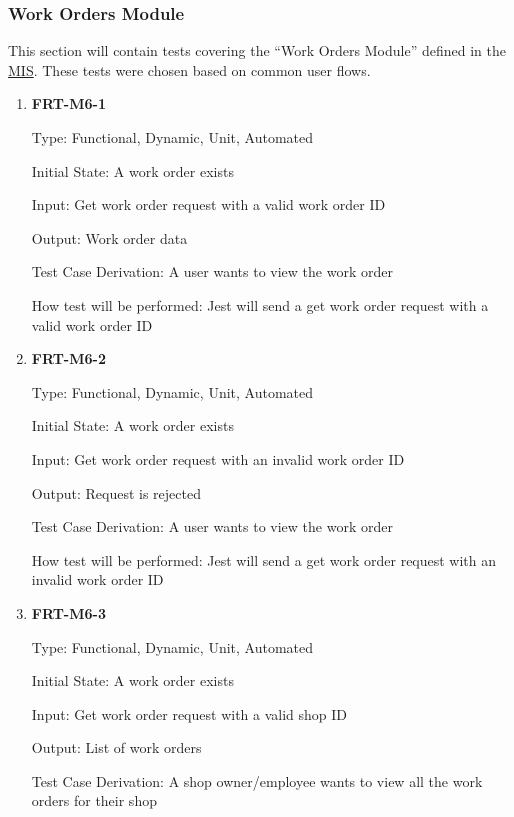 \documentclass[12pt, titlepage]{article}
\begin{document}
\subsubsection{Work Orders Module}

This section will contain tests covering the ``Work Orders Module'' defined in the
\href{https://github.com/arkinmodi/project-sayyara/blob/main/docs/Design/MIS/MIS.pdf}{MIS}. These
tests were chosen based on common user flows.

\begin{enumerate}

	\item \textbf{FRT-M6-1}

	      Type: Functional, Dynamic, Unit, Automated

	      Initial State: A work order exists

	      Input: Get work order request with a valid work order ID

	      Output: Work order data

	      Test Case Derivation: A user wants to view the work order

	      How test will be performed: Jest will send a get work order request with a valid work order ID

	\item \textbf{FRT-M6-2}

	      Type: Functional, Dynamic, Unit, Automated

	      Initial State: A work order exists

	      Input: Get work order request with an invalid work order ID

	      Output: Request is rejected

	      Test Case Derivation: A user wants to view the work order

	      How test will be performed: Jest will send a get work order request with an invalid work order ID

	\item \textbf{FRT-M6-3}

	      Type: Functional, Dynamic, Unit, Automated

	      Initial State: A work order exists

	      Input: Get work order request with a valid shop ID

	      Output: List of work orders

	      Test Case Derivation: A shop owner/employee wants to view all the work orders for their shop


\end{enumerate}
\end{document}
